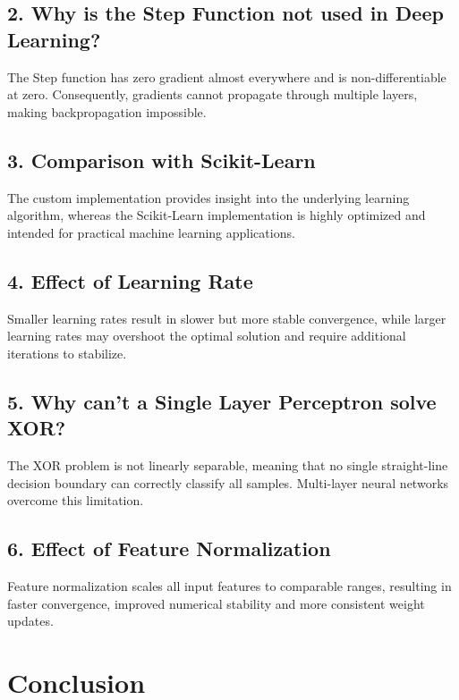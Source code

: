 \documentclass[12pt,a4paper]{article}
\begin{document}
\subsection*{2. Why is the Step Function not used in Deep Learning?}

The Step function has zero gradient almost everywhere and is non-differentiable at zero. Consequently, gradients cannot propagate through multiple layers, making backpropagation impossible.

\subsection*{3. Comparison with Scikit-Learn}

The custom implementation provides insight into the underlying learning algorithm, whereas the Scikit-Learn implementation is highly optimized and intended for practical machine learning applications.

\subsection*{4. Effect of Learning Rate}

Smaller learning rates result in slower but more stable convergence, while larger learning rates may overshoot the optimal solution and require additional iterations to stabilize.

\subsection*{5. Why can't a Single Layer Perceptron solve XOR?}

The XOR problem is not linearly separable, meaning that no single straight-line decision boundary can correctly classify all samples. Multi-layer neural networks overcome this limitation.

\subsection*{6. Effect of Feature Normalization}

Feature normalization scales all input features to comparable ranges, resulting in faster convergence, improved numerical stability and more consistent weight updates.


\section{Conclusion}
\end{document}

